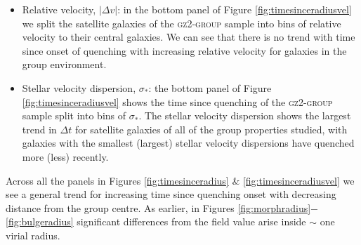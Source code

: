 \documentclass[useAMS,usenatbib]{mn2e}
\begin{document}
\begin{itemize}
\item{Relative velocity, $|\Delta v|$: in the bottom panel of Figure \ref{fig:timesinceradiusvel} we split the satellite galaxies of the \textsc{gz2-group} sample into bins of relative velocity to their central galaxies. We can see that there is no trend with time since onset of quenching with increasing relative velocity for galaxies in the group environment.}

\item{Stellar velocity dispersion, $\sigma_*$: the bottom panel of Figure \ref{fig:timesinceradiusvel} shows the time since quenching of the \textsc{gz2-group} sample split into bins of $\sigma_*$. The stellar velocity dispersion shows the largest trend in $\Delta t$ for satellite galaxies of all of the group properties studied, with galaxies with the smallest (largest) stellar velocity dispersions have quenched more (less) recently. }
\end{itemize}

Across all the panels in Figures \ref{fig:timesinceradius} \& \ref{fig:timesinceradiusvel} we see a general trend for increasing time since quenching onset with decreasing distance from the group centre. As earlier, in Figures \ref{fig:morphradius}$-$\ref{fig:bulgeradius} significant differences from the field value arise inside $\sim$ one virial radius. 
\end{document}
